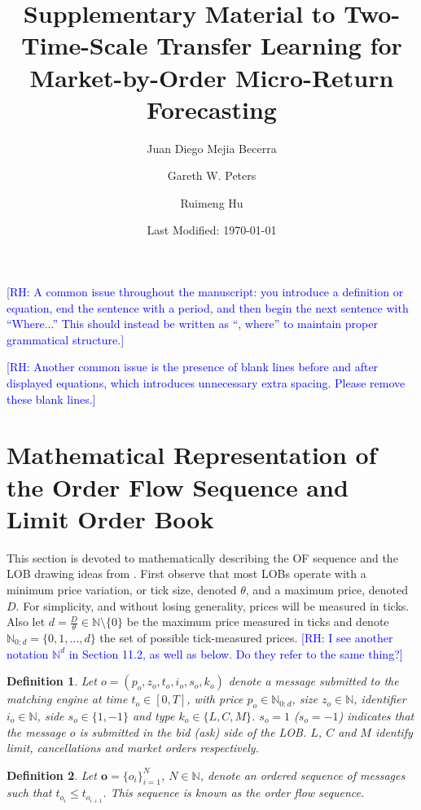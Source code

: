 \documentclass[10pt,a4paper,oneside]{article}
\title{Supplementary Material to Two-Time-Scale Transfer Learning for Market-by-Order Micro-Return Forecasting}
\author[1]{Juan Diego Mejia Becerra}
\author[1]{Gareth W. Peters}
\author[1,2]{Ruimeng Hu}
\affil[1]{Department of Statistics and Applied Probability, University of California, Santa Barbara}
\affil[2]{Department of Mathematics, University of California, Santa Barbara}
\date{Last Modified: \today}
\newcommand{\N}{\mathbb{N}}
\newcommand{\rh}[1]{\textcolor{blue}{\textsf{[RH: #1]}}}
\newtheorem{definition}{Definition}
\providecommand{\DIFdeltex}[1]{{\protect\color{red} \scriptsize #1}} %
\providecommand{\DIFdelbegin}{} %
\providecommand{\DIFdelend}{} %
\providecommand{\DIFdel}[1]{\texorpdfstring{\DIFdeltex{#1}}{}} %
\newcommand{\DIFscaledelfig}{0.5}
\newlength{\DIFdelgraphicswidth} %
\newlength{\DIFdelgraphicsheight} %
\newcommand{\DIFdelincludegraphics}[2][]{%
\sbox{\DIFdelgraphicsbox}{\DIFOincludegraphics[#1]{#2}}%
\settoboxwidth{\DIFdelgraphicswidth}{\DIFdelgraphicsbox} %
\settoboxtotalheight{\DIFdelgraphicsheight}{\DIFdelgraphicsbox} %
\scalebox{\DIFscaledelfig}{%
\parbox[b]{\DIFdelgraphicswidth}{\usebox{\DIFdelgraphicsbox}\\[-\baselineskip] \rule{\DIFdelgraphicswidth}{0em}}\llap{\resizebox{\DIFdelgraphicswidth}{\DIFdelgraphicsheight}{%
\setlength{\unitlength}{\DIFdelgraphicswidth}%
\begin{picture}(1,1)%
\thicklines\linethickness{2pt} %
{\color[rgb]{1,0,0}\put(0,0){\framebox(1,1){}}}%
{\color[rgb]{1,0,0}\put(0,0){\line( 1,1){1}}}%
{\color[rgb]{1,0,0}\put(0,1){\line(1,-1){1}}}%
\end{picture}%
}\hspace*{3pt}}} %
} %
\DeclareRobustCommand{\DIFdelbegin}{\DIFOdelbegin \let\includegraphics\DIFdelincludegraphics} %
\DeclareRobustCommand{\DIFdelend}{\DIFOaddend \let\includegraphics\DIFOincludegraphics} %
\begin{document}
\maketitle

\tableofcontents
\clearpage


\appendix

\DIFdelbegin \DIFdel{\rh{A common issue throughout the manuscript: you introduce a definition or equation, end the sentence with a period, and then begin the next sentence with “Where...” This should instead be written as “, where” to maintain proper grammatical structure.}
}%

\DIFdel{\rh{Another common issue is the presence of blank lines before and after displayed equations, which introduces unnecessary extra spacing. Please remove these blank lines.}
}\DIFdelend \section{Mathematical Representation of the Order Flow Sequence and Limit Order Book}
\label{ap:matreplob}


This section is devoted to mathematically describing the OF sequence and the LOB drawing ideas from \cite{cont2023mathematical, gould2013limit, panayi2015stochastic}. First observe that most LOBs operate with a minimum price variation, or tick size, denoted $\theta$, and a maximum price, denoted $D$. For simplicity, and without losing generality, prices will be measured in ticks. Also let $d = \frac{D}{\theta} \in \N \setminus \{ 0 \}$ be the maximum price measured in ticks and denote $\N_{0:d} = \{ 0, 1, \dots, d\}$ the set of possible tick-measured prices.
\DIFdelbegin \DIFdel{\rh{I see another notation $\N^d$ in Section 11.2, as well as below. Do they refer to the same thing?}
 }\DIFdelend 

\begin{definition}
    Let $o = (p_o, z_o, t_o, i_o, s_o, k_o)$ denote a message submitted to the matching engine at time $t_o \in [0, T]$, with price $p_o \in \N_{0:d}$, size $z_o \in \N$, identifier $i_o \in \N$, side $s_o \in \{1, -1\}$ and type $k_o \in \{L, C, M \}$. $s_o = 1$ ($s_o = -1$) indicates that the message $o$ is submitted in the bid (ask) side of the LOB. $L$, $C$ and $M$ identify limit, cancellations and market orders respectively. 
    \label{def:order}
\end{definition}

\begin{definition}
    Let $\mathbf{o} = \{o_i\}^N_{i = 1} $, $N \in \N$, denote an ordered sequence of messages such that $t_{o_i} \leq t_{o_{i + 1}}$. This sequence is known as the order flow sequence.
\label{def:order_seq}
\end{definition}
\end{document}
